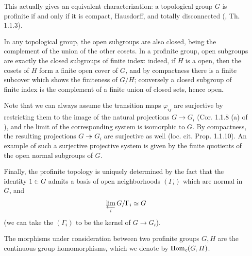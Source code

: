 \documentclass[a4paper, oneside]{memoir}
\begin{document}
\begin{remark}\label{rm:CptTotDisc}
	This actually gives an equivalent characterization: a topological group $G$ is profinite if and only if it is compact, Hausdorff, and totally disconnected (\cite{Neukirch}, Th. 1.1.3).
\end{remark}

In any topological group, the open subgroups are also closed, being the complement of the union of the other cosets. In a profinite group, open subgroups are exactly the closed subgroups of finite index: indeed, if $H$ is a open, then the cosets of $H$ form a finite open cover of $G$, and by compactness there is a finite subcover which shows the finiteness of $G/H$; conversely a closed subgroup of finite index is the complement of a finite union of closed sets, hence open.

Note that we can always assume the transition maps $\varphi_{ij}$ are surjective by restricting them to the image of the natural projections $G \to G_i$ (Cor. 1.1.8 (a) of \cite{RibesZalesskii}), and the limit of the corresponding system is isomorphic to $G$. By compactness, the resulting projections $G\twoheadrightarrow G_i$ are surjective as well (loc. cit. Prop. 1.1.10). An example of such a surjective projective system is given by the finite quotients of the open normal subgroups of $G$.

Finally, the profinite topology is uniquely determined by the fact that the identity $1\in G$ admits a basis of open neighborhoods $(\Gamma_i)$ which are normal in $G$, and \[\varprojlim_i{G /\Gamma_i}\simeq G\] (we can take the $(\Gamma_i)$ to be the kernel of $G\to G_i$).

The morphisms under consideration between two profinite groups $G,H$ are the continuous group homomorphisms, which we denote by $\operatorname{Hom}_{c}(G,H)$.
\end{document}
